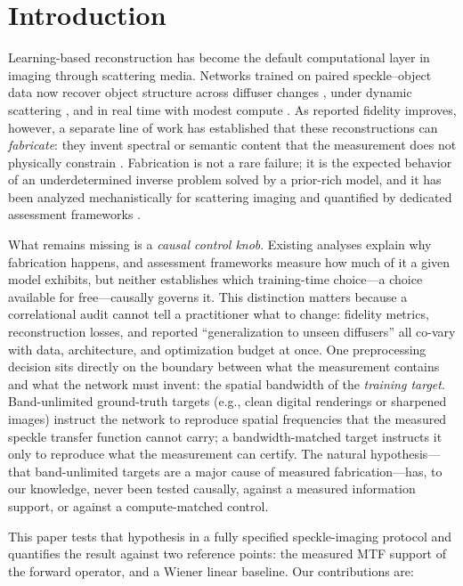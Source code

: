 \section{Introduction}

Learning-based reconstruction has become the default computational layer in imaging through scattering media. Networks trained on paired speckle--object data now recover object structure across diffuser changes \cite{li2018deep}, under dynamic scattering \cite{liu2024learning}, and in real time with modest compute \cite{zhang2024memoryless}. As reported fidelity improves, however, a separate line of work has established that these reconstructions can \emph{fabricate}: they invent spectral or semantic content that the measurement does not physically constrain \cite{zhang2026physical,tivnan2024hallucination}. Fabrication is not a rare failure; it is the expected behavior of an underdetermined inverse problem solved by a prior-rich model, and it has been analyzed mechanistically for scattering imaging \cite{zhang2026physical} and quantified by dedicated assessment frameworks \cite{long2026universal}.

What remains missing is a \emph{causal control knob}. Existing analyses explain why fabrication happens, and assessment frameworks measure how much of it a given model exhibits, but neither establishes which training-time choice---a choice available for free---causally governs it. This distinction matters because a correlational audit cannot tell a practitioner what to change: fidelity metrics, reconstruction losses, and reported ``generalization to unseen diffusers'' all co-vary with data, architecture, and optimization budget at once. One preprocessing decision sits directly on the boundary between what the measurement contains and what the network must invent: the spatial bandwidth of the \emph{training target}. Band-unlimited ground-truth targets (e.g., clean digital renderings or sharpened images) instruct the network to reproduce spatial frequencies that the measured speckle transfer function cannot carry; a bandwidth-matched target instructs it only to reproduce what the measurement can certify. The natural hypothesis---that band-unlimited targets are a major cause of measured fabrication---has, to our knowledge, never been tested causally, against a measured information support, or against a compute-matched control.

This paper tests that hypothesis in a fully specified speckle-imaging protocol and quantifies the result against two reference points: the measured MTF support of the forward operator, and a Wiener linear baseline. Our contributions are:

